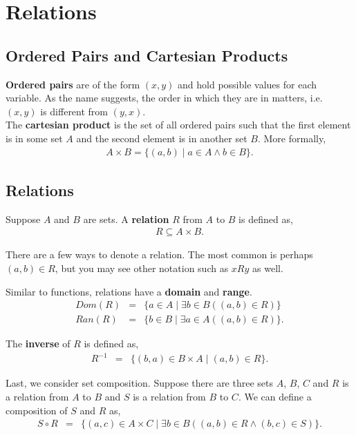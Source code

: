 \documentclass{article}
\begin{document}
\section{Relations}
\subsection{Ordered Pairs and Cartesian Products}
\textbf{Ordered pairs} are of the form $(x,y)$ and hold possible values for each variable. As the name suggests, the order in which they are in matters,
i.e. $(x,y)$ is different from $(y,x)$. \\

\noindent The \textbf{cartesian product} is the set of all ordered pairs such that the first element is in some set $A$ and the second element is in
another set $B$. More formally,
\begin{eqnarray*}
    A \times B = \{ (a,b) \; | \; a \in A \land b \in B \}.
\end{eqnarray*}

\subsection{Relations}
Suppose $A$ and $B$ are sets. A \textbf{relation} $R$ from $A$ to $B$ is defined as,
\begin{eqnarray*}
    R \subseteq A \times B.
\end{eqnarray*}

\noindent There are a few ways to denote a relation. The most common is perhaps $(a,b) \in R$, but you may see other notation such as $xRy$ as well.

\noindent Similar to functions, relations have a \textbf{domain} and \textbf{range}.
\begin{eqnarray*}
    Dom(R) &=& \{ a \in A \; | \; \exists b \in B ((a,b) \in R) \} \\
    Ran(R) &=& \{ b \in B \; | \; \exists a \in A ((a, b) \in R) \}.
\end{eqnarray*}

\noindent The \textbf{inverse} of $R$ is defined as,
\begin{eqnarray*}
    R^{-1} &=& \{ (b,a) \in B \times A \; | \; (a,b) \in R \}.
\end{eqnarray*}

\noindent Last, we consider set composition. Suppose there are three sets $A$, $B$, $C$ and $R$ is a relation from $A$ to $B$ and $S$ is a relation
from $B$ to $C$. We can define a composition of $S$ and $R$ as,
\begin{eqnarray*}
    S \circ R &=& \{ (a,c) \in A \times C \; | \; \exists b \in B ((a, b) \in R \land (b, c) \in S) \}.
\end{eqnarray*}
\end{document}
